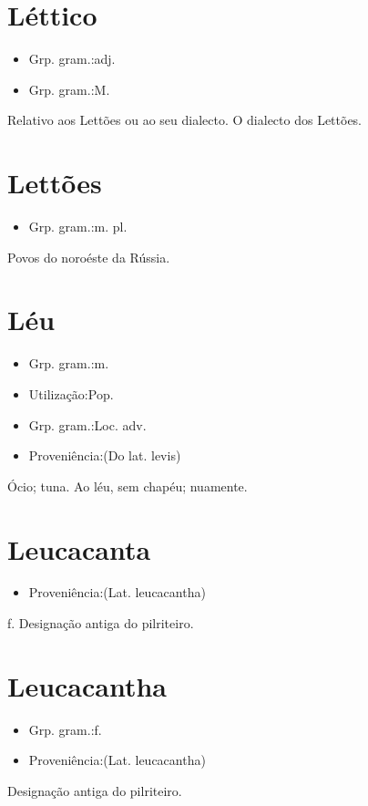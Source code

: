 \section{Léttico}
\begin{itemize}
\item {Grp. gram.:adj.}
\end{itemize}
\begin{itemize}
\item {Grp. gram.:M.}
\end{itemize}
Relativo aos Lettões ou ao seu dialecto.
O dialecto dos Lettões.
\section{Lettões}
\begin{itemize}
\item {Grp. gram.:m. pl.}
\end{itemize}
Povos do noroéste da Rússia.
\section{Léu}
\begin{itemize}
\item {Grp. gram.:m.}
\end{itemize}
\begin{itemize}
\item {Utilização:Pop.}
\end{itemize}
\begin{itemize}
\item {Grp. gram.:Loc. adv.}
\end{itemize}
\begin{itemize}
\item {Proveniência:(Do lat. \textunderscore levis\textunderscore )}
\end{itemize}
Ócio; tuna.
\textunderscore Ao léu\textunderscore , sem chapéu; nuamente.
\section{Leucacanta}
\begin{itemize}
\item {Proveniência:(Lat. \textunderscore leucacantha\textunderscore )}
\end{itemize}
\textunderscore f.\textunderscore 
Designação antiga do pilriteiro.
\section{Leucacantha}
\begin{itemize}
\item {Grp. gram.:f.}
\end{itemize}
\begin{itemize}
\item {Proveniência:(Lat. \textunderscore leucacantha\textunderscore )}
\end{itemize}
Designação antiga do pilriteiro.
